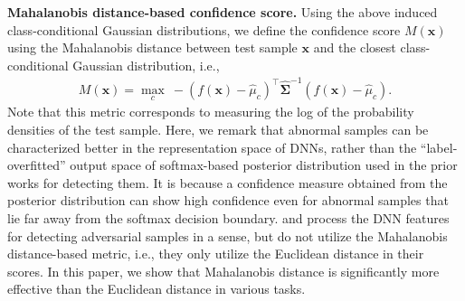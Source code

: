 \documentclass{article}
\begin{document}
{\bf Mahalanobis distance-based confidence score.}
Using the above induced class-conditional Gaussian distributions, 
we define the confidence score $M(\mathbf{x})$ using the Mahalanobis distance between test sample $\mathbf{x}$ and the closest class-conditional Gaussian distribution, i.e.,
\begin{align} \label{eq:mahalanobis}
M(\mathbf{x}) = \max_c ~ - \left( f(\mathbf{x}) - {\widehat \mu}_{c} \right)^\top \mathbf{\widehat \Sigma}^{-1} \left(f(\mathbf{x}) - {\widehat \mu}_{c}\right).
\end{align}
Note that this metric corresponds to measuring the log of the
probability densities of the test sample.
Here, we remark that abnormal samples can be characterized better in the representation space of DNNs, rather than the ``label-overfitted'' output space of softmax-based posterior distribution used in the prior works \cite{hendrycks2016baseline, liang2017principled} for detecting them.
It is because a confidence measure obtained from the posterior distribution can show high confidence even for abnormal samples that lie far away from the softmax decision boundary.
\citet{feinman2017detecting} and \citet{ma2018characterizing} process the DNN features for detecting adversarial samples in a sense, but do not utilize the Mahalanobis distance-based metric, i.e., they only utilize the Euclidean distance in their scores.
In this paper,
we show that Mahalanobis distance is significantly more effective than
the Euclidean distance in various tasks. 
\end{document}
